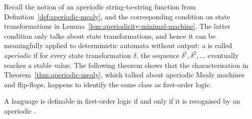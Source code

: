 Recall the notion of an aperiodic string-to-string function from Definition~\ref{def:aperiodic-mealy}, and the corresponding condition on state transformations in Lemma~\ref{lem:aperiodicity-minimal-machine}. The latter condition only talks about state transformations, and hence it  can be meaningfully applied to deterministic automata without output:  a \dfa is called \emph{aperiodic} if for every state transformation $\delta$, the sequence $\delta^1, \delta^2, \ldots$ eventually reaches a stable value. The following theorem shows that the characterisation in Theorem~\ref{thm:aperiodic-mealy}, which talked about aperiodic Mealy machines and flip-flops, happens to identify the same class as first-order logic.
\begin{theorem}
    \label{thm:logic-aperiodic}
    A language is definable in first-order logic if and only if it is recognised by an aperiodic \dfa.
\end{theorem}
